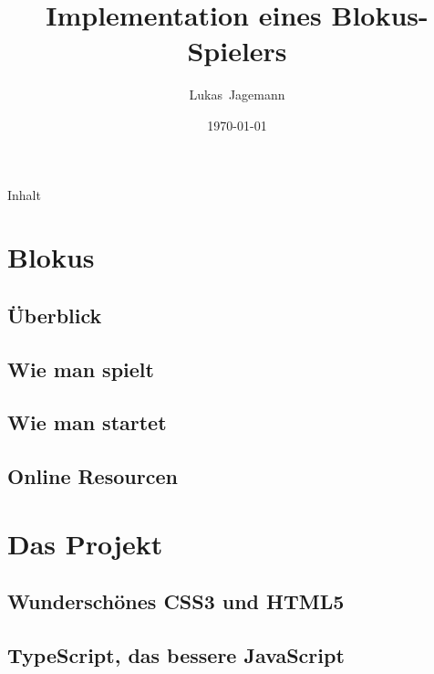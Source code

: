 \documentclass[12pt]{beamer}
\title{Implementation eines Blokus-Spielers}
\author{\mbox{Lukas Jagemann}}
\date{\today}
\begin{document}
\begin{frame}
    \vspace*{-20pt}
    \titlepage
\end{frame}

\begin{frame}{Inhalt}
	\setcounter{tocdepth}{1}
    \tableofcontents
\end{frame}

\section{Blokus}
\subsection{Überblick} \begin{frame}\end{frame}
% 
\subsection{Wie man spielt} \begin{frame}\end{frame}
\subsection{Wie man startet} \begin{frame}\end{frame}
\subsection{Online Resourcen} \begin{frame}\end{frame} %

\section{Das Projekt}
\subsection{Wunderschönes CSS3 und HTML5} \begin{frame}\end{frame}
\subsection{TypeScript, das bessere JavaScript} \begin{frame}\end{frame}
\end{document}
